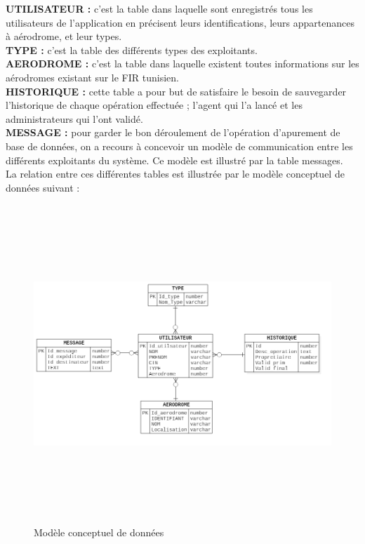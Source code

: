 \textbf{UTILISATEUR :} c’est la table dans laquelle sont enregistrés tous les utilisateurs de l’application en précisent leurs identifications, leurs appartenances à aérodrome, et leur types.\\

\textbf{TYPE :} c’est la table des différents types des exploitants.\\

\textbf{AERODROME :} c’est la table dans laquelle existent toutes informations sur les aérodromes existant sur le FIR tunisien.\\

\textbf{HISTORIQUE :} cette table a pour but de satisfaire le besoin de sauvegarder l’historique de chaque opération effectuée ; l’agent qui l'a lancé et les administrateurs qui l’ont validé. \\

\textbf{MESSAGE :} pour garder le bon déroulement de l’opération d’apurement de base de données, on a recours à concevoir un modèle de communication entre les différents exploitants du système. Ce modèle est illustré par la table messages.\\

La relation entre ces différentes tables est illustrée par le modèle conceptuel de données suivant : \\

\begin{figure}[!h]
\begin{center}
\includegraphics[width=17cm,height=12cm]{Conception/ERDDiagram1.png}
\end{center}
\caption{Modèle conceptuel de données }
\end{figure}
\newpage
